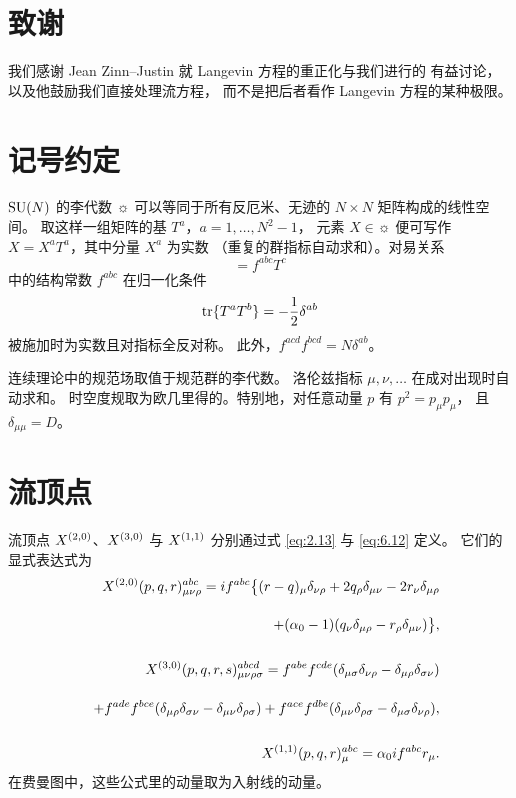 \section*{致谢}
我们感谢 Jean Zinn--Justin 就 Langevin 方程的重正化与我们进行的
有益讨论，以及他鼓励我们直接处理流方程，
而不是把后者看作 Langevin 方程的某种极限。

\appendix

\section{记号约定}\label{app:A}

$\mathrm{SU}(N)$ 的李代数 $\sun$
可以等同于所有反厄米、无迹的 $N\times N$ 矩阵构成的线性空间。
取这样一组矩阵的基 $T^a$，$a=1,\ldots,N^2-1$，
元素 $X\in\sun$ 便可写作 $X=X^aT^a$，其中分量 $X^a$ 为实数
（重复的群指标自动求和）。对易关系
\begin{equation}
  [T^a,T^b]=f^{abc}T^c
  \label{eq:A.1}
\end{equation}
中的结构常数 $f^{abc}$ 在归一化条件
\begin{equation}
  \mathrm{tr}\{T^aT^b\}=-\frac{1}{2}\delta^{ab}
  \label{eq:A.2}
\end{equation}
被施加时为实数且对指标全反对称。
此外，$f^{acd}f^{bcd}=N\delta^{ab}$。

连续理论中的规范场取值于规范群的李代数。
洛伦兹指标 $\mu,\nu,\ldots$ 在成对出现时自动求和。
时空度规取为欧几里得的。特别地，对任意动量 $p$ 有 $p^2=p_{\mu}p_{\mu}$，
且 $\delta_{\mu\mu}=D$。

\section{流顶点}\label{app:B}

流顶点 $X^{(2,0)}$、$X^{(3,0)}$ 与 $X^{(1,1)}$
分别通过式 \eqref{eq:2.13} 与 \eqref{eq:6.12} 定义。
它们的显式表达式为
\begin{align}
  X^{(2,0)}(p,q,r)^{abc}_{\mu\nu\rho}=
  if^{abc}\bigl\{(r-q)_{\mu}\delta_{\nu\rho}
  +2q_{\rho}\delta_{\mu\nu}-2r_{\nu}\delta_{\mu\rho}
  \notag\\[2.5ex]
  +(\alpha_0-1)
  (q_{\nu}\delta_{\mu\rho}-r_{\rho}\delta_{\mu\nu})\bigr\},
  \label{eq:B.1}\\[3.5ex]
  X^{(3,0)}(p,q,r,s)^{abcd}_{\mu\nu\rho\sigma}=
  f^{abe}f^{cde}
  (\delta_{\mu\sigma}\delta_{\nu\rho}-\delta_{\mu\rho}\delta_{\sigma\nu})
  \notag\\[2.5ex]
  \quad
  +f^{ade}f^{bce}
  (\delta_{\mu\rho}\delta_{\sigma\nu}-\delta_{\mu\nu}\delta_{\rho\sigma})+
  f^{ace}f^{dbe}
  (\delta_{\mu\nu}\delta_{\rho\sigma}-\delta_{\mu\sigma}\delta_{\nu\rho}),
  \label{eq:B.2}\\[3.5ex]
  X^{(1,1)}(p,q,r)^{abc}_{\mu}=\alpha_0if^{abc}r_{\mu}.
  \label{eq:B.3}
\end{align}
在费曼图中，这些公式里的动量取为入射线的动量。

